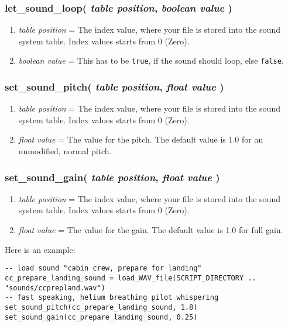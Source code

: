 \documentclass[11pt,parskip=half,a4paper]{scrartcl}
\begin{document}
\subsubsection{ let\_sound\_loop( \emph{table position}, \emph{boolean value} )}

\begin{enumerate}
	\item \emph{table position} = The index value, where your file is stored into the sound system table. Index values starts from 0 (Zero).
	\item \emph{boolean value} = This has to be \verb|true|, if the sound should loop, else \verb|false|.
\end{enumerate}

\subsubsection{ set\_sound\_pitch( \emph{table position}, \emph{float value} )}

\begin{enumerate}
	\item \emph{table position} = The index value, where your file is stored into the sound system table. Index values starts from 0 (Zero).
	\item \emph{float value} = The value for the pitch. The default value is 1.0 for an unmodified, normal pitch.
\end{enumerate}

\subsubsection{ set\_sound\_gain( \emph{table position}, \emph{float value} )}

\begin{enumerate}
	\item \emph{table position} = The index value, where your file is stored into the sound system table. Index values starts from 0 (Zero).
	\item \emph{float value} = The value for the gain. The default value is 1.0 for full gain.
\end{enumerate}

Here is an example:

\begin{lstlisting}
-- load sound "cabin crew, prepare for landing"
cc_prepare_landing_sound = load_WAV_file(SCRIPT_DIRECTORY .. "sounds/ccprepland.wav")
-- fast speaking, helium breathing pilot whispering
set_sound_pitch(cc_prepare_landing_sound, 1.8)
set_sound_gain(cc_prepare_landing_sound, 0.25)
\end{lstlisting}
\end{document}
